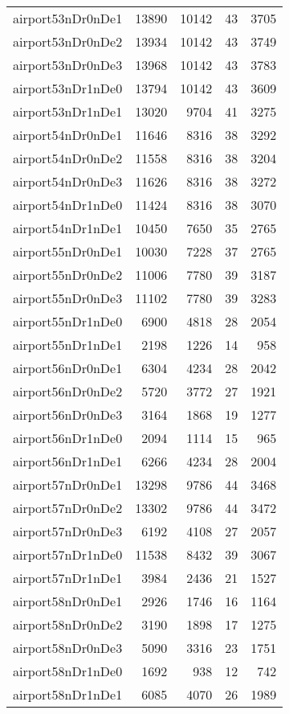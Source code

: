 \begin{longtable}{lrrrr}
airport53nDr0nDe1 & 13890 & 10142 & 43 & 3705 \\
airport53nDr0nDe2 & 13934 & 10142 & 43 & 3749 \\
airport53nDr0nDe3 & 13968 & 10142 & 43 & 3783 \\
airport53nDr1nDe0 & 13794 & 10142 & 43 & 3609 \\
airport53nDr1nDe1 & 13020 & 9704 & 41 & 3275 \\
airport54nDr0nDe1 & 11646 & 8316 & 38 & 3292 \\
airport54nDr0nDe2 & 11558 & 8316 & 38 & 3204 \\
airport54nDr0nDe3 & 11626 & 8316 & 38 & 3272 \\
airport54nDr1nDe0 & 11424 & 8316 & 38 & 3070 \\
airport54nDr1nDe1 & 10450 & 7650 & 35 & 2765 \\
airport55nDr0nDe1 & 10030 & 7228 & 37 & 2765 \\
airport55nDr0nDe2 & 11006 & 7780 & 39 & 3187 \\
airport55nDr0nDe3 & 11102 & 7780 & 39 & 3283 \\
airport55nDr1nDe0 & 6900 & 4818 & 28 & 2054 \\
airport55nDr1nDe1 & 2198 & 1226 & 14 & 958 \\
airport56nDr0nDe1 & 6304 & 4234 & 28 & 2042 \\
airport56nDr0nDe2 & 5720 & 3772 & 27 & 1921 \\
airport56nDr0nDe3 & 3164 & 1868 & 19 & 1277 \\
airport56nDr1nDe0 & 2094 & 1114 & 15 & 965 \\
airport56nDr1nDe1 & 6266 & 4234 & 28 & 2004 \\
airport57nDr0nDe1 & 13298 & 9786 & 44 & 3468 \\
airport57nDr0nDe2 & 13302 & 9786 & 44 & 3472 \\
airport57nDr0nDe3 & 6192 & 4108 & 27 & 2057 \\
airport57nDr1nDe0 & 11538 & 8432 & 39 & 3067 \\
airport57nDr1nDe1 & 3984 & 2436 & 21 & 1527 \\
airport58nDr0nDe1 & 2926 & 1746 & 16 & 1164 \\
airport58nDr0nDe2 & 3190 & 1898 & 17 & 1275 \\
airport58nDr0nDe3 & 5090 & 3316 & 23 & 1751 \\
airport58nDr1nDe0 & 1692 & 938 & 12 & 742 \\
airport58nDr1nDe1 & 6085 & 4070 & 26 & 1989 \\

\end{longtable}
